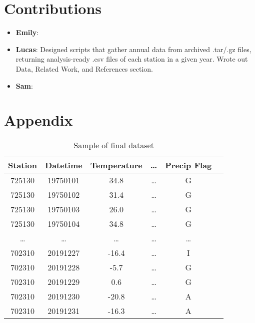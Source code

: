 \documentclass[conference]{IEEEtran}
\begin{document}
\section{Contributions}

\begin{itemize}
\item \textbf{Emily}:
\item \textbf{Lucas}: Designed scripts that gather annual data from archived .tar/.gz files, returning analysis-ready .csv files of each station in a given year. Wrote out Data, Related Work, and References section.
\item \textbf{Sam}:
\end{itemize}

\section{Appendix}

\begin{table}[h!]
\centering
 \begin{tabular}{||c c c c c c||} 
 \hline
  Station& Datetime &Temperature & \dots & Precip Flag \\ [0.5ex] 
 \hline\hline
 725130 & 19750101 & 34.8 & \dots & G \\
 725130 & 19750102 & 31.4 & \dots & G \\
 725130 & 19750103 & 26.0 & \dots & G \\
 725130 & 19750104 & 34.8 & \dots & G \\
 \dots & \dots & \dots & \dots & \dots \\
 702310 & 20191227 & -16.4 & \dots & I \\
 702310 & 20191228 & -5.7 & \dots & G \\
 702310 & 20191229 & 0.6 & \dots & G \\
 702310 & 20191230 & -20.8 & \dots & A \\
 702310 & 20191231 & -16.3 & \dots & A \\[1ex] 
 
 \hline
 \end{tabular}
 \caption{Sample of final dataset}
\end{table}
\end{document}
